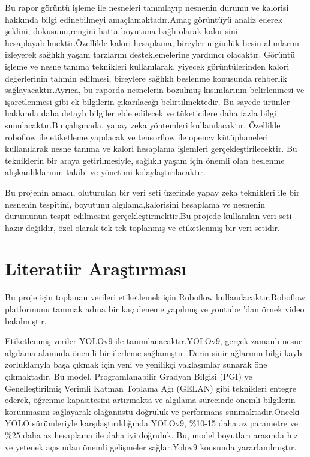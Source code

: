 \documentclass[11pt,a4paper]{report}
\begin{document}
	Bu rapor görüntü işleme ile nesneleri tanımlayıp nesnenin durumu ve kalorisi hakkında bilgi edinebilmeyi amaçlamaktadır.Amaç görüntüyü analiz ederek şeklini, dokusunu,rengini hatta boyutuna bağlı olarak kalorisini hesaplayabilmektir.Özellikle kalori hesaplama, bireylerin günlük besin alımlarını izleyerek sağlıklı yaşam tarzlarını desteklemelerine yardımcı olacaktır. Görüntü işleme ve nesne tanıma teknikleri kullanılarak, yiyecek görüntülerinden kalori değerlerinin tahmin edilmesi, bireylere sağlıklı beslenme konusunda rehberlik sağlayacaktır.Ayrıca, bu raporda nesnelerin bozulmuş kısımlarının belirlenmesi ve işaretlenmesi gibi ek bilgilerin çıkarılacağı belirtilmektedir. Bu sayede ürünler hakkında daha detaylı bilgiler elde edilecek ve tüketicilere daha fazla bilgi sunulacaktır.Bu çalışmada, yapay zeka yöntemleri kullanılacaktır. Özellikle roboflow ile etiketleme yapılacak ve tensorflow ile opencv kütüphaneleri kullanılarak nesne tanıma ve kalori hesaplama işlemleri gerçekleştirilecektir. Bu tekniklerin bir araya getirilmesiyle, sağlıklı yaşam için önemli olan beslenme alışkanlıklarının takibi ve yönetimi kolaylaştırılacaktır.
	\newline
	
	Bu projenin amacı, oluturulan bir veri seti üzerinde yapay zeka teknikleri ile bir nesnenin tespitini, boyutunu algılama,kalorisini hesaplama ve nesnenin durumunun tespit edilmesini gerçekleştirmektir.Bu projede kullanılan veri seti hazır değildir, özel olarak tek tek toplanmış ve etiketlenmiş bir veri setidir.
	
	\pagebreak
	
    \section{Literatür Araştırması}    
     Bu proje için toplanan verileri etiketlemek için Roboflow kullanılacaktır.Roboflow platformunu tanımak adına bir kaç deneme yapılmış ve youtube 'dan örnek video bakılmıştır\cite{roboflowvideo}. \newline
     
   
    Etiketlenmiş veriler YOLOv9 ile tanımlanacaktır.YOLOv9, gerçek zamanlı nesne algılama alanında önemli bir ilerleme sağlamıştır. Derin sinir ağlarının bilgi kaybı zorluklarıyla başa çıkmak için yeni ve yenilikçi yaklaşımlar sunarak öne çıkmaktadır. Bu model, Programlanabilir Gradyan Bilgisi (PGI) ve Genelleştirilmiş Verimli Katman Toplama Ağı (GELAN) gibi teknikleri entegre ederek, öğrenme kapasitesini artırmakta ve algılama sürecinde önemli bilgilerin korunmasını sağlayarak olağanüstü doğruluk ve performans sunmaktadır.Önceki YOLO sürümleriyle karşılaştırıldığında YOLOv9, \%10-15 daha az parametre ve \%25 daha az hesaplama ile daha iyi doğruluk. Bu, model boyutları arasında hız ve yetenek açısından önemli gelişmeler sağlar.Yolov9 konsunda \cite{yolov9} yararlanılmıştır.
    \newline
    
\end{document}
